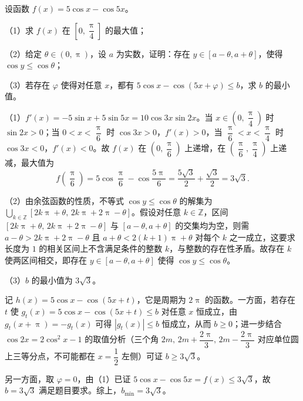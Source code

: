 \documentclass{exam-zh}
\begin{document}
\begin{problem}[points = 17]
设函数 $f(x)=5\cos x-\cos 5x$。

（1）求 $f(x)$ 在 $\left[0,\dfrac{\uppi}{4}\right]$ 的最大值；

（2）给定 $\theta\in(0,\uppi)$，设 $a$ 为实数，证明：存在 $y\in[a-\theta,a+\theta]$，使得 $\cos y\le\cos\theta$；

（3）若存在 $\varphi$ 使得对任意 $x$，都有 $5\cos x-\cos(5x+\varphi)\le b$，求 $b$ 的最小值。

\begin{solution}
（1）$f'(x)=-5\sin x+5\sin 5x=10\cos 3x\sin 2x$。当 $x\in\left(0,\dfrac{\uppi}{4}\right)$ 时 $\sin 2x>0$；当 $0<x<\dfrac{\uppi}{6}$ 时 $\cos 3x>0$，$f'(x)>0$，当 $\dfrac{\uppi}{6}<x<\dfrac{\uppi}{4}$ 时 $\cos 3x<0$，$f'(x)<0$。故 $f(x)$ 在 $\left(0,\dfrac{\uppi}{6}\right)$ 上递增，在 $\left(\dfrac{\uppi}{6},\dfrac{\uppi}{4}\right)$ 上递减，最大值为
\[f\left(\dfrac{\uppi}{6}\right)=5\cos\dfrac{\uppi}{6}-\cos\dfrac{5\uppi}{6}=\dfrac{5\sqrt{3}}{2}+\dfrac{\sqrt{3}}{2}=3\sqrt{3}.\]

（2）由余弦函数的性质，不等式 $\cos y\le\cos\theta$ 的解集为 $\bigcup_{k\in\mathbb{Z}}[2k\uppi+\theta,\,2k\uppi+2\uppi-\theta]$。假设对任意 $k\in\mathbb{Z}$，区间 $[2k\uppi+\theta,\,2k\uppi+2\uppi-\theta]$ 与 $[a-\theta,a+\theta]$ 的交集均为空，则需 $a-\theta>2k\uppi+2\uppi-\theta$ 且 $a+\theta<2(k+1)\uppi+\theta$ 对每个 $k$ 之一成立，这要求长度为 $1$ 的相关区间上不含满足条件的整数 $k$，与整数的存在性矛盾。故存在 $k$ 使两区间相交，即存在 $y\in[a-\theta,a+\theta]$ 使得 $\cos y\le\cos\theta$。

（3）$b$ 的最小值为 $3\sqrt{3}$。

记 $h(x)=5\cos x-\cos(5x+t)$，它是周期为 $2\uppi$ 的函数。一方面，若存在 $t$ 使 $g_{t}(x)=5\cos x-\cos(5x+t)\le b$ 对任意 $x$ 恒成立，由 $g_{t}(x+\uppi)=-g_{t}(x)$ 可得 $|g_{t}(x)|\le b$ 恒成立，从而 $b\ge 0$；进一步结合 $\cos 2x=2\cos^{2}x-1$ 的取值分析（三个角 $2m,\,2m+\dfrac{2\uppi}{3},\,2m-\dfrac{2\uppi}{3}$ 对应单位圆上三等分点，不可能都在 $x=\dfrac12$ 左侧）可证 $b\ge 3\sqrt{3}$。

另一方面，取 $\varphi=0$，由（1）已证 $5\cos x-\cos 5x=f(x)\le 3\sqrt{3}$，故 $b=3\sqrt{3}$ 满足题目要求。综上，$b_{\min}=3\sqrt{3}$。
\end{solution}
\end{problem}
\end{document}
